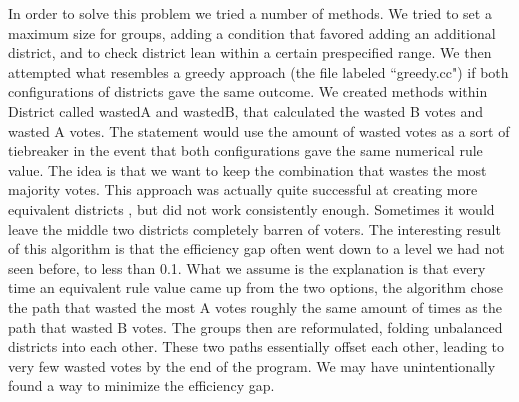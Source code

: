 \documentclass{article}
\begin{document}
	In order to solve this problem we tried a number of methods. We tried to set a maximum size for groups, adding a condition that favored adding an additional district, and to check district lean within a certain prespecified range. We then attempted what resembles a greedy approach (the file labeled “greedy.cc") if both configurations of districts gave the same outcome. We created methods within District called wastedA and wastedB, that calculated the 
wasted B votes and wasted A votes. The statement would use the amount of wasted votes as a sort of tiebreaker in the event that both configurations gave the same numerical rule value. The idea is that we want to keep the combination that wastes the most majority votes. This approach was actually quite successful at creating more equivalent districts , but did not work consistently enough. Sometimes it would leave the middle two districts completely barren of voters. The interesting result of this algorithm is that the efficiency gap often went down to a level we had not seen before, to less than 0.1. What we assume is the explanation is that every time an equivalent rule value came up from the two options, the algorithm chose the path that wasted the most A votes roughly the same amount of times as the path that wasted B votes. The groups then are reformulated, folding unbalanced districts into each other. These two paths essentially offset each other, leading to very few wasted votes by the end of the program. We may have unintentionally found a way to minimize the efficiency gap.
\end{document}
